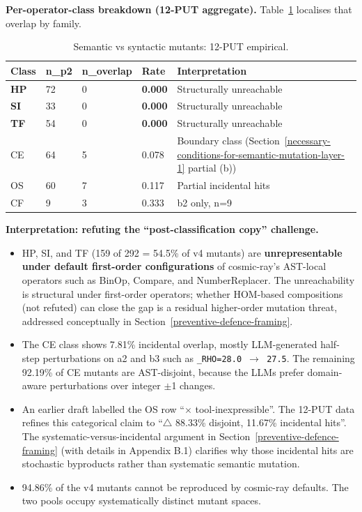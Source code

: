 \documentclass[manuscript,screen,review]{acmart}
\begin{document}
\textbf{Per-operator-class breakdown (12-PUT aggregate).}
Table~\ref{tab:p2-05} localises that overlap by family.

{%
\begin{longtable}[]{@{}lllll@{}}
\caption{Semantic vs syntactic mutants: 12-PUT empirical.}\label{tab:p2-05}\\
\toprule\noalign{}
Class & n\_p2 & n\_overlap & Rate & Interpretation \\
\midrule\noalign{}
\endfirsthead
\endhead
\bottomrule\noalign{}
\endlastfoot
\textbf{HP} & 72 & 0 & \textbf{0.000} & Structurally unreachable \\
\textbf{SI} & 33 & 0 & \textbf{0.000} & Structurally unreachable \\
\textbf{TF} & 54 & 0 & \textbf{0.000} & Structurally unreachable \\
CE & 64 & 5 & 0.078 & Boundary class (Section~\ref{necessary-conditions-for-semantic-mutation-layer-1} partial (b)) \\
OS & 60 & 7 & 0.117 & Partial incidental hits \\
CF & 9 & 3 & 0.333 & b2 only, n=9 \\
\end{longtable}
}

\textbf{Interpretation: refuting the ``post-classification copy''
challenge.}

\begin{itemize}

\item
  HP, SI, and TF (159 of 292 = 54.5\% of v4 mutants) are
  \textbf{unrepresentable under default first-order configurations} of
  cosmic-ray's AST-local operators such as BinOp, Compare, and
  NumberReplacer. The unreachability is structural under first-order
  operators; whether HOM-based compositions \citep{jia2008subtle} (not
  refuted) can close the gap is a residual higher-order mutation threat, addressed
  conceptually in Section~\ref{preventive-defence-framing}.
\item
  The CE class shows 7.81\% incidental overlap, mostly LLM-generated
  half-step perturbations on a2 and b3 such as
  \texttt{\_RHO=28.0\ $\to$\ 27.5}. The remaining 92.19\% of CE mutants are
  AST-disjoint, because the LLMs prefer domain-aware perturbations over
  integer $\pm$1 changes.
\item
  An earlier draft labelled the OS row ``$\times$ tool-inexpressible''. The
  12-PUT data refines this categorical claim to ``$\bigtriangleup$ 88.33\% disjoint,
  11.67\% incidental hits''. The systematic-versus-incidental argument
  in Section~\ref{preventive-defence-framing} (with details in Appendix B.1) clarifies why those
  incidental hits are stochastic byproducts rather than systematic
  semantic mutation.
\item
  94.86\% of the v4 mutants cannot be reproduced by cosmic-ray defaults.
  The two pools occupy systematically distinct mutant spaces.
\end{itemize}
\end{document}
